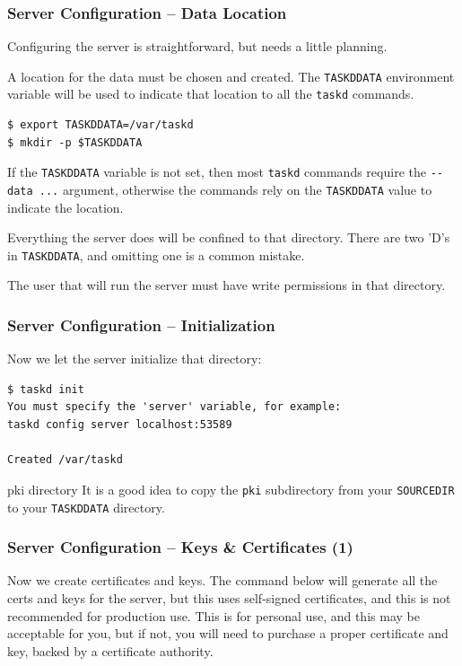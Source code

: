 \documentclass[t,handout]{beamer}
\begin{document}
\begin{frame}[fragile]\frametitle{Server Configuration -- Data Location}\label{serverconfiguration}
    \vfill
    Configuring the server is straightforward, but needs a little planning.

    A location for the data must be chosen and created. The \verb+TASKDDATA+ environment variable will be used to indicate that location to all the \verb+taskd+ commands.

    \begin{lstlisting}
$ export TASKDDATA=/var/taskd
$ mkdir -p $TASKDDATA\end{lstlisting}

    If the \verb+TASKDDATA+ variable is not set, then most \verb+taskd+ commands require the \verb+--data ...+ argument, otherwise the commands rely on the \verb+TASKDDATA+ value to indicate the location.

    \begin{alertblock}{Everything the server does will be confined to that directory.}
        There are two 'D's in \verb+TASKDDATA+, and omitting one is a common mistake.

        The user that will run the server must have write permissions in that directory.
	\end{alertblock}
\end{frame}

\begin{frame}[fragile]\frametitle{Server Configuration -- Initialization}
    \vfill
    Now we let the server initialize that directory:

    \begin{lstlisting}
$ taskd init
You must specify the 'server' variable, for example:
taskd config server localhost:53589

Created /var/taskd\end{lstlisting}

    \begin{alertblock}{pki directory}
        It is a good idea to copy the \verb=pki= subdirectory from your \verb=SOURCEDIR= to your \verb=TASKDDATA= directory.
    \end{alertblock}
\end{frame}

\begin{frame}[fragile]\frametitle{Server Configuration -- Keys \& Certificates (1)}
    \vfill
    Now we create certificates and keys. The command below will generate all the certs and keys for the server, but this uses self-signed certificates, and this is not recommended for production use. This is for personal use, and this may be acceptable for you, but if not, you will need to purchase a proper certificate and key, backed by a certificate authority.
\end{frame}
\end{document}
